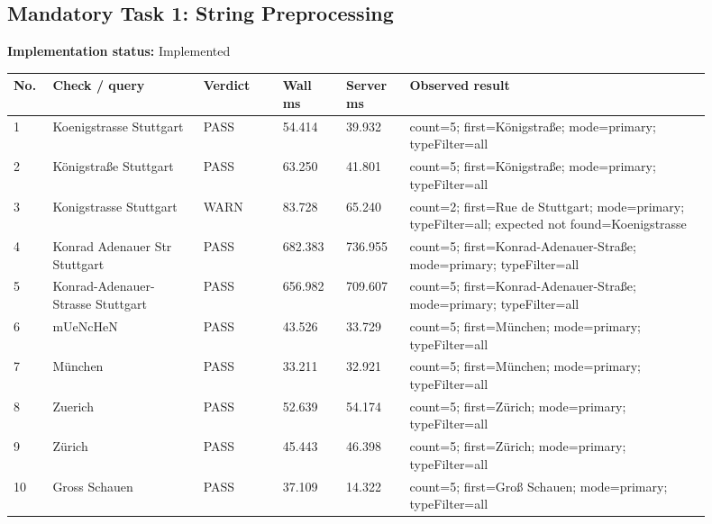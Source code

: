\documentclass[10pt,a4paper]{article}
\begin{document}
\subsection{Mandatory Task 1: String Preprocessing}
\textbf{Implementation status:} Implemented\\
\scriptsize
\begin{longtable}{|P{0.045\linewidth}|P{0.19\linewidth}|P{0.105\linewidth}|P{0.085\linewidth}|P{0.085\linewidth}|P{0.385\linewidth}|}
\hline
\textbf{No.} & \textbf{Check / query} & \textbf{Verdict} & \textbf{Wall ms} & \textbf{Server ms} & \textbf{Observed result}\\ \hline
{} 1 & Koenigstrasse Stuttgart & PASS & 54.414 & 39.932 & count=5; first=Königstraße; mode=primary; typeFilter=all\\ \hline
{} 2 & Königstraße Stuttgart & PASS & 63.250 & 41.801 & count=5; first=Königstraße; mode=primary; typeFilter=all\\ \hline
{} 3 & Konigstrasse Stuttgart & WARN & 83.728 & 65.240 & count=2; first=Rue de Stuttgart; mode=primary; typeFilter=all; expected not found=Koenigstrasse\\ \hline
{} 4 & Konrad Adenauer Str Stuttgart & PASS & 682.383 & 736.955 & count=5; first=Konrad-Adenauer-Straße; mode=primary; typeFilter=all\\ \hline
{} 5 & Konrad-Adenauer-Strasse Stuttgart & PASS & 656.982 & 709.607 & count=5; first=Konrad-Adenauer-Straße; mode=primary; typeFilter=all\\ \hline
{} 6 & mUeNcHeN & PASS & 43.526 & 33.729 & count=5; first=München; mode=primary; typeFilter=all\\ \hline
{} 7 & München & PASS & 33.211 & 32.921 & count=5; first=München; mode=primary; typeFilter=all\\ \hline
{} 8 & Zuerich & PASS & 52.639 & 54.174 & count=5; first=Zürich; mode=primary; typeFilter=all\\ \hline
{} 9 & Zürich & PASS & 45.443 & 46.398 & count=5; first=Zürich; mode=primary; typeFilter=all\\ \hline
{} 10 & Gross Schauen & PASS & 37.109 & 14.322 & count=5; first=Groß Schauen; mode=primary; typeFilter=all\\ \hline
\end{longtable}
\normalsize
\end{document}
